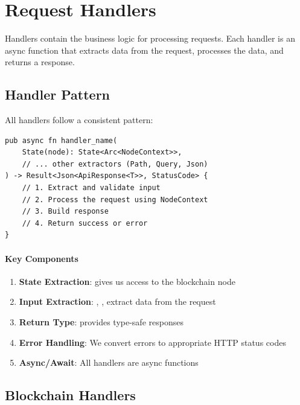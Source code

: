 \section{Request Handlers}
\label{sec:handlers}

Handlers contain the business logic for processing requests. Each handler is an async function that extracts data from the request, processes the data, and returns a response.

\subsection{Handler Pattern}

All handlers follow a consistent pattern:

\begin{listing}[htbp]
\caption{Standard handler pattern}
\label{lst:handler-pattern}
\begin{verbatim}
pub async fn handler_name(
    State(node): State<Arc<NodeContext>>,
    // ... other extractors (Path, Query, Json)
) -> Result<Json<ApiResponse<T>>, StatusCode> {
    // 1. Extract and validate input
    // 2. Process the request using NodeContext
    // 3. Build response
    // 4. Return success or error
}
\end{verbatim}
\end{listing}

\paragraph{Key Components}

\begin{enumerate}
  \item \textbf{State Extraction}:  gives us access to the blockchain node
  \item \textbf{Input Extraction}: , ,  extract data from the request
  \item \textbf{Return Type}:  provides type-safe responses
  \item \textbf{Error Handling}: We convert errors to appropriate HTTP status codes
  \item \textbf{Async/Await}: All handlers are async functions
\end{enumerate}

\subsection{Blockchain Handlers}


